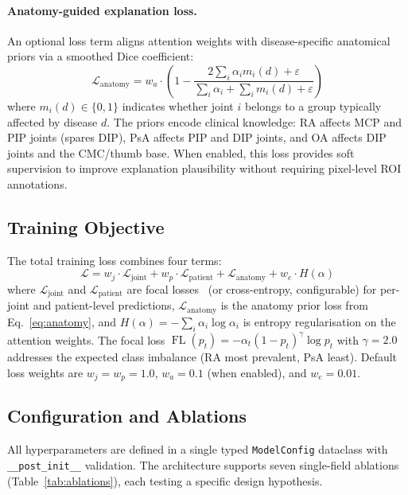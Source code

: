 \documentclass{article}
\begin{document}
\paragraph{Anatomy-guided explanation loss.} An optional loss term aligns attention weights with disease-specific anatomical priors via a smoothed Dice coefficient:
\begin{equation}
\mathcal{L}_{\text{anatomy}} = w_a \cdot \left(1 - \frac{2\sum_i \alpha_i m_i(d) + \varepsilon}{\sum_i \alpha_i + \sum_i m_i(d) + \varepsilon}\right)
\label{eq:anatomy}
\end{equation}
where $m_i(d) \in \{0,1\}$ indicates whether joint $i$ belongs to a group typically affected by disease $d$. The priors encode clinical knowledge: RA affects MCP and PIP joints (spares DIP), PsA affects PIP and DIP joints, and OA affects DIP joints and the CMC/thumb base. When enabled, this loss provides soft supervision to improve explanation plausibility without requiring pixel-level ROI annotations.

\subsection{Training Objective}

The total training loss combines four terms:
\begin{equation}
\mathcal{L} = w_j \cdot \mathcal{L}_{\text{joint}} + w_p \cdot \mathcal{L}_{\text{patient}} + \mathcal{L}_{\text{anatomy}} + w_e \cdot H(\alpha)
\label{eq:loss}
\end{equation}
where $\mathcal{L}_{\text{joint}}$ and $\mathcal{L}_{\text{patient}}$ are focal losses~\cite{focalloss2017} (or cross-entropy, configurable) for per-joint and patient-level predictions, $\mathcal{L}_{\text{anatomy}}$ is the anatomy prior loss from Eq.~\ref{eq:anatomy}, and $H(\alpha) = -\sum_i \alpha_i \log \alpha_i$ is entropy regularisation on the attention weights. The focal loss $\operatorname{FL}(p_t) = -\alpha_t (1-p_t)^\gamma \log p_t$ with $\gamma=2.0$ addresses the expected class imbalance (RA most prevalent, PsA least). Default loss weights are $w_j = w_p = 1.0$, $w_a = 0.1$ (when enabled), and $w_e = 0.01$.

\subsection{Configuration and Ablations}

All hyperparameters are defined in a single typed \texttt{ModelConfig} dataclass with \texttt{\_\_post\_init\_\_} validation. The architecture supports seven single-field ablations (Table~\ref{tab:ablations}), each testing a specific design hypothesis.
\end{document}
